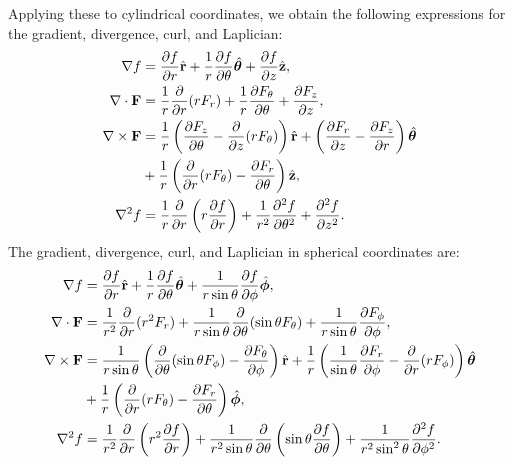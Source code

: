 Applying these to cylindrical coordinates, we obtain the following expressions for the gradient, divergence, curl, and Laplician:
\begin{subequations}
\begin{align}
  \nabla f &= \dho{f}{r} \rhat + \frac{1}{r} \dho{f}{\theta} \thetahat + \dho{f}{z} \zhat , \\
  \nabla \cdot \mathbf{F} &= \frac{1}{r} \dho{}{r}(r F_r) + \frac{1}{r} \dho{F_\theta}{\theta} + \dho{F_z}{z} , \\
  \nabla \times \mathbf{F} &= 
    \frac{1}{r} \left( \dho{F_z}{\theta} - \dho{}{z} ( r F_\theta ) \right) \rhat 
  +             \left( \dho{F_r}{z} - \dho{F_z}{r}  \right) \thetahat \nonumber \\
  &+ \frac{1}{r} \left(  \dho{}{r} ( r F_\theta ) - \dho{F_r}{\theta} \right) \zhat , \\
  \nabla^2 f &= \frac{1}{r} \dho{}{r} \left( r \dho{f}{r} \right) + \frac{1}{r^2} \dhotwo{f}{\theta} + \dhotwo{f}{z} .
\end{align}
\end{subequations}
The gradient, divergence, curl, and Laplician in spherical coordinates are:
\begin{subequations}
\begin{align}
  \nabla f &=   \dho{f}{r} \rhat + \frac{1}{r} \dho{f}{\theta} \thetahat + \frac{1}{r \sin \theta} \dho{f}{\phi} \phihat , \\
  \nabla \cdot \mathbf{F} &= \frac{1}{r^2} \dho{}{r} ( r^2 F_r ) + \frac{1}{r \sin \theta} \dho{}{\theta} ( \sin \theta F_\theta ) + \frac{1}{r \sin \theta} \dho{F_\phi}{\phi}, \\
  \nabla \times \mathbf{F} &= 
    \frac{1}{r \sin \theta} \left( \dho{}{\theta} ( \sin \theta F_\phi ) - \dho{F_\theta}{\phi} \right) \rhat
  + \frac{1}{r} \left( \frac{1}{\sin \theta } \dho{F_r}{\phi} -  \dho{}{r} ( r F_\phi ) \right) \thetahat \nonumber \\
 &+ \frac{1}{r} \left( \dho{}{r} ( r F_\theta ) - \dho{ F_r }{ \theta } \right) \phihat , \\
   \nabla^2 f &= \frac{1}{r^2} \dho{}{r} \left( r^2 \dho{f}{r} \right) 
               + \frac{1}{r^2 \sin \theta } \dho{}{\theta} \left( \sin \theta \dho{f}{\theta} \right) 
               + \frac{1}{r^2 \sin^2 \theta } \dhotwo{f}{\phi} .
\end{align}
\end{subequations}


